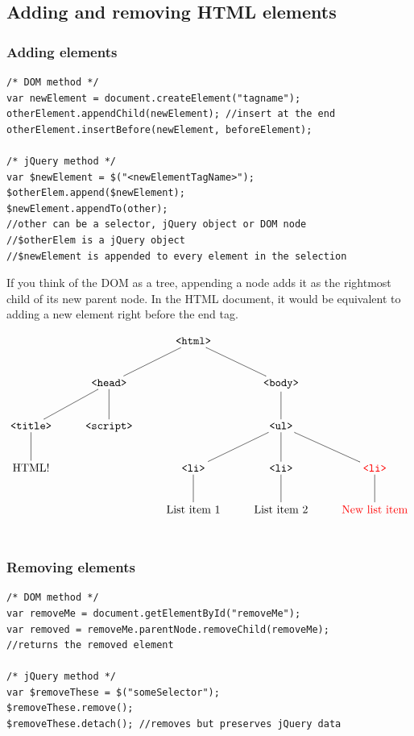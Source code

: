 \documentclass[12pt]{article}
\begin{document}
\subsection{Adding and removing HTML elements}
\subsubsection*{Adding elements}
\begin{Verbatim}[frame=single]
/* DOM method */
var newElement = document.createElement("tagname");
otherElement.appendChild(newElement); //insert at the end
otherElement.insertBefore(newElement, beforeElement);

/* jQuery method */
var $newElement = $("<newElementTagName>");
$otherElem.append($newElement);
$newElement.appendTo(other);
//other can be a selector, jQuery object or DOM node
//$otherElem is a jQuery object
//$newElement is appended to every element in the selection
\end{Verbatim}
If you think of the DOM as a tree, appending a node adds it as the rightmost child of its new parent node. In the HTML document, it would be equivalent to adding a new element right before the end tag. 

\begin{displaymath}
    \xymatrix{
      & & \texttt{<html>} \ar@{-}[dl] \ar@{-}[dr] & \\
      & \texttt{<head>} \ar@{-}[dl] \ar@{-}[d] & & \texttt{<body>} \ar@{-}[d] \\
      \texttt{<title>} \ar@{-}[d] & \texttt{<script>} & & \texttt{<ul>} \ar@{-}[dl] \ar@{-}[d] \ar@{-}[dr] \\
      \text{HTML!} & & \texttt{<li>} \ar@{-}[d] & \texttt{<li>} \ar@{-}[d] & \texttt{\color{red} <li>} \ar@{-}[d] \\
      & & \text{List item 1} & \text{List item 2} & \text{\color{red} New list item} \\
    }
\end{displaymath}
\\

\subsubsection*{Removing elements}
\begin{Verbatim}[frame=single]
/* DOM method */
var removeMe = document.getElementById("removeMe");
var removed = removeMe.parentNode.removeChild(removeMe);
//returns the removed element

/* jQuery method */
var $removeThese = $("someSelector");
$removeThese.remove();
$removeThese.detach(); //removes but preserves jQuery data
\end{Verbatim}
\end{document}
